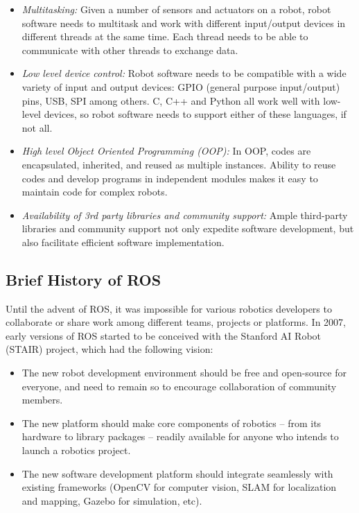 \begin{itemize}
    \item \textit{Multitasking:} Given a number of sensors and actuators on a robot, robot software needs to multitask and work with different input/output devices in different threads at the same time. Each thread needs to be able to communicate with other threads to exchange data. 
    
    \item \textit{Low level device control:} Robot software needs to be compatible with a wide variety of input and output devices: GPIO (general purpose input/output) pins, USB, SPI among others. C, C++ and Python all work well with low-level devices, so robot software needs to support either of these languages, if not all. 
    
    \item \textit{High level Object Oriented Programming (OOP):} In OOP, codes are encapsulated, inherited, and reused as multiple instances. Ability to reuse codes and develop programs in independent modules makes it easy to maintain code for complex robots.
    
    \item \textit{Availability of 3rd party libraries and community support:} Ample third-party libraries and community support not only expedite software development, but also facilitate efficient software implementation.
    
\end{itemize}

\subsection{Brief History of ROS}
Until the advent of ROS, it was impossible for various robotics developers to collaborate or share work among different teams, projects or platforms. In 2007, early versions of ROS started to be conceived with the Stanford AI Robot (STAIR) project, which had the following vision:

\begin{itemize}
    \item The new robot development environment should be free and open-source for everyone, and need to remain so to encourage collaboration of community members.
    \item The new platform should make core components of robotics -- from its hardware to library packages  -- readily available for anyone who intends to launch a robotics project.
    \item The new software development platform should integrate seamlessly with existing frameworks (OpenCV for computer vision, SLAM for localization and mapping, Gazebo for simulation, etc).
\end{itemize}

